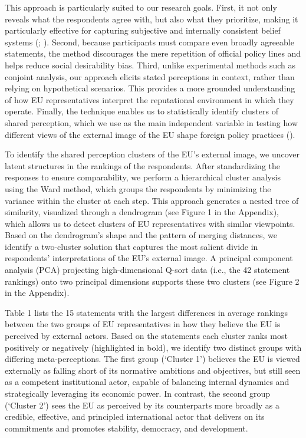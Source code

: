 \documentclass[
  letterpaper,
  DIV=11,
  numbers=noendperiod]{scrartcl}
\begin{document}
This approach is particularly suited to our research goals. First, it
not only reveals what the respondents agree with, but also what they
prioritize, making it particularly effective for capturing subjective
and internally consistent belief systems
(;
). Second, because
participants must compare even broadly agreeable statements, the method
discourages the mere repetition of official policy lines and helps
reduce social desirability bias. Third, unlike experimental methods such
as conjoint analysis, our approach elicits stated perceptions in
context, rather than relying on hypothetical scenarios. This provides a
more grounded understanding of how EU representatives interpret the
reputational environment in which they operate. Finally, the technique
enables us to statistically identify clusters of shared perception,
which we use as the main independent variable in testing how different
views of the external image of the EU shape foreign policy practices
().

To identify the shared perception clusters of the EU's external image,
we uncover latent structures in the rankings of the respondents. After
standardizing the responses to ensure comparability, we perform a
hierarchical cluster analysis using the Ward method, which groups the
respondents by minimizing the variance within the cluster at each step.
This approach generates a nested tree of similarity, visualized through
a dendrogram (see Figure 1 in the Appendix), which allows us to detect
clusters of EU representatives with similar viewpoints. Based on the
dendrogram's shape and the pattern of merging distances, we identify a
two-cluster solution that captures the most salient divide in
respondents' interpretations of the EU's external image. A principal
component analysis (PCA) projecting high-dimensional Q-sort data (i.e.,
the 42 statement rankings) onto two principal dimensions supports these
two clusters (see Figure 2 in the Appendix).

Table 1 lists the 15 statements with the largest differences in average
rankings between the two groups of EU representatives in how they
believe the EU is perceived by external actors. Based on the statements
each cluster ranks most positively or negatively (highlighted in bold),
we identify two distinct groups with differing meta-perceptions. The
first group (`Cluster 1') believes the EU is viewed externally as
falling short of its normative ambitions and objectives, but still seen
as a competent institutional actor, capable of balancing internal
dynamics and strategically leveraging its economic power. In contrast,
the second group (`Cluster 2') sees the EU as perceived by its
counterparts more broadly as a credible, effective, and principled
international actor that delivers on its commitments and promotes
stability, democracy, and development.
\end{document}
